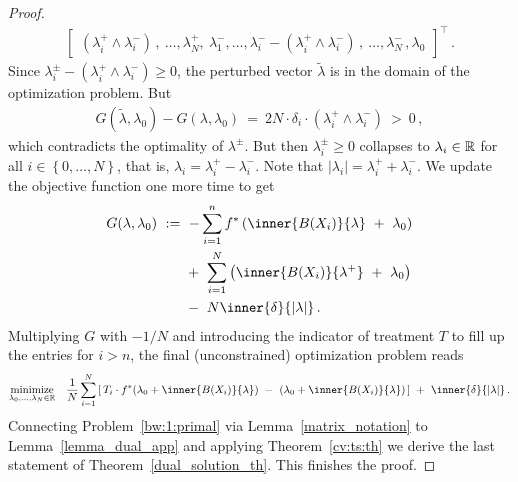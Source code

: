 \begin{proof}
\begin{gather}
\begin{bmatrix}
      (
      \lambda_i^+
      \!
      \land
      \lambda_i^-
      )\,,
      \ 
      \ldots,
      \lambda_N^+,
      \ 
      \lambda_1^-,
      \ldots,
      \lambda_i^-
      \!
      -
      (
      \lambda_i^+
      \!
      \land
      \lambda_i^-
      )\,,
      \ 
      \ldots,
      \lambda_N^-
      \,,
      \lambda_0
    \end{bmatrix}
    ^\top
    \,.
  \end{gather}
  Since 
  $
      \lambda_i^\pm
      -
      (
      \lambda_i^+
      \!
      \land
      \lambda_i^-
      )
      \ge 
      0
  $,
  the perturbed vector $\tilde{\lambda}$ is in the domain of the 
  optimization problem.
  But 
  \begin{align}
  G(\tilde{\lambda},\lambda_0)
  -
  G(\lambda,\lambda_0)
  \ 
  =
  \ 
  2
  N
  \cdot
  \delta_i
  \cdot
      (
      \lambda_i^+
      \!
      \land
      \lambda_i^-
      )
  \ 
  >
  \ 
  0
  \,,
  \end{align}
  which contradicts the optimality of $\lambda^\pm$.
But then 
$
\lambda^\pm_i
\ge 0
$
collapses to
$
\lambda_i\in \mathbb{R}
$ 
for all
$i\in \left\{ 0,\ldots,N \right\}$, that is,
$ \lambda_i=\lambda_i^+\!-\lambda_i^- $.
Note that
$ |\lambda_i|=\lambda_i^+\!+\lambda_i^- $.
We update the objective function one more time to get
\begin{align*}
  G(\lambda,\lambda_0)
  &
  \ 
  :=
  \ 
    -
    \sum_{i=1}^{n} 
    f^*
    \left( 
      \inner{B(X_i)}{\lambda}
      \ 
      +
      \ 
      \lambda_0
    \right)
    \\
    &
    \qquad 
    +
    \ 
    \sum_{i=1}^{N} 
    \left( 
      \inner{B(X_i)}{\lambda^+}
      \ 
      +
      \ 
      \lambda_0
    \right)
    \\
    &
    \qquad 
    -
    \ 
    N
    \inner{\delta}{|\lambda|}
    \,.
\end{align*}
Multiplying $G$ with $-1/N$ and introducing the indicator of
treatment $T$ to fill up the entries for $i>n$, the final (unconstrained) optimization problem reads
\begin{gather*}
  \underset
  {\lambda_0,\ldots,\lambda_{N}\in \R}
  {
    \mathrm{minimize}
  }
  \quad
  \frac{1}{N}
\sum_{i=1} 
  ^N
  \left[ 
    \,
  T_i
  \cdot
  f^*
  \!
  \left( 
\lambda_0
+
\inner
{B(X_i)}
{\lambda}
  \right)
  \ 
-
\ 
  \left( 
\lambda_0
+
\inner
{B(X_i)}
{\lambda}
  \right)
  \,
  \right]
  \ 
+
\ 
\inner
{\delta}
{|\lambda|}
  \,.
\end{gather*}
Connecting Problem~\ref{bw:1:primal} via Lemma~\ref{matrix_notation} to Lemma~\ref{lemma_dual_app} and applying Theorem~\ref{cv:ts:th} we derive the last statement of Theorem~\ref{dual_solution_th}. This finishes the proof.
\end{proof}

